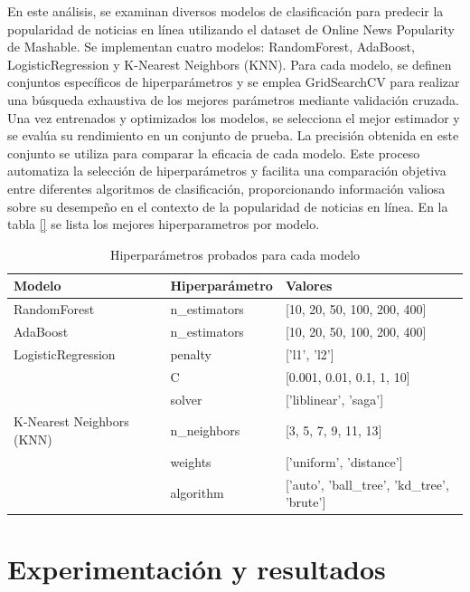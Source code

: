 \documentclass[
  number,
  preprint,
  3p,
  twocolumn]{elsarticle}
\begin{document}
En este análisis, se examinan diversos modelos de clasificación para
predecir la popularidad de noticias en línea utilizando el dataset de
Online News Popularity de Mashable. Se implementan cuatro modelos:
RandomForest, AdaBoost, LogisticRegression y K-Nearest Neighbors (KNN).
Para cada modelo, se definen conjuntos específicos de hiperparámetros y
se emplea GridSearchCV para realizar una búsqueda exhaustiva de los
mejores parámetros mediante validación cruzada. Una vez entrenados y
optimizados los modelos, se selecciona el mejor estimador y se evalúa su
rendimiento en un conjunto de prueba. La precisión obtenida en este
conjunto se utiliza para comparar la eficacia de cada modelo. Este
proceso automatiza la selección de hiperparámetros y facilita una
comparación objetiva entre diferentes algoritmos de clasificación,
proporcionando información valiosa sobre su desempeño en el contexto de
la popularidad de noticias en línea. En la tabla \ref{} se lista los
mejores hiperparametros por modelo.

\begin{table}[h!]
    \centering
    \begin{tabular}{|l|l|l|}
        \hline
        \textbf{Modelo} & \textbf{Hiperparámetro} & \textbf{Valores} \\ \hline
        RandomForest & n\_estimators & [10, 20, 50, 100, 200, 400] \\ \hline
        AdaBoost & n\_estimators & [10, 20, 50, 100, 200, 400] \\ \hline
        LogisticRegression & penalty & ['l1', 'l2'] \\ \hline
        & C & [0.001, 0.01, 0.1, 1, 10] \\ \hline
        & solver & ['liblinear', 'saga'] \\ \hline
        K-Nearest Neighbors (KNN) & n\_neighbors & [3, 5, 7, 9, 11, 13] \\ \hline
        & weights & ['uniform', 'distance'] \\ \hline
        & algorithm & ['auto', 'ball\_tree', 'kd\_tree', 'brute'] \\ \hline
    \end{tabular}
    \caption{Hiperparámetros probados para cada modelo}
    \label{tab:hyperparams}
\end{table}

\section{Experimentación y
resultados}\label{experimentaciuxf3n-y-resultados}
\end{document}

